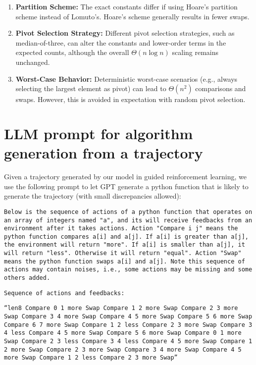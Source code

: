 \documentclass[pdflatex,sn-mathphys-num]{sn-jnl}%
\theoremstyle{thmstyleone}%
\theoremstyle{thmstyletwo}%
\theoremstyle{thmstylethree}%
\begin{document}
\begin{appendices}
\begin{enumerate}
    \item \textbf{Partition Scheme:} The exact constants differ if using Hoare's partition scheme instead of Lomuto's. Hoare's scheme generally results in fewer swaps.
    
    \item \textbf{Pivot Selection Strategy:} Different pivot selection strategies, such as median-of-three, can alter the constants and lower-order terms in the expected counts, although the overall \( \Theta(n \log n) \) scaling remains unchanged.
    
    \item \textbf{Worst-Case Behavior:} Deterministic worst-case scenarios (e.g., always selecting the largest element as pivot) can lead to \( \Theta(n^2) \) comparisons and swaps. However, this is avoided in expectation with random pivot selection.
\end{enumerate}

\section{LLM prompt for algorithm generation from a trajectory} \label{appendixB}

Given a trajectory generated by our model in guided reinforcement learning, we use the following prompt to let GPT generate a python function that is likely to generate the trajectory (with small discrepancies allowed):

\texttt{Below is the sequence of actions of a python function that operates on an array of integers named "a", and its will receive feedbacks from an environment after it takes actions. Action "Compare i j" means the python function compares a[i] and a[j]. If a[i] is greater than a[j], the environment will return "more". If a[i] is smaller than a[j], it will return "less". Otherwise it will return "equal". Action "Swap" means the python function swaps a[i] and a[j]. Note this sequence of actions may contain noises, i.e., some actions may be missing and some others added. }

\texttt{Sequence of actions and feedbacks:}

\texttt{``len8 Compare 0 1 more Swap Compare 1 2 more Swap Compare 2 3 more Swap Compare 3 4 more Swap Compare 4 5 more Swap Compare 5 6 more Swap Compare 6 7 more Swap Compare 1 2 less Compare 2 3 more Swap Compare 3 4 less Compare 4 5 more Swap Compare 5 6 more Swap Compare 0 1 more Swap Compare 2 3 less Compare 3 4 less Compare 4 5 more Swap Compare 1 2 more Swap Compare 2 3 more Swap Compare 3 4 more Swap Compare 4 5 more Swap Compare 1 2 less Compare 2 3 more Swap''}


\end{appendices}
\end{document}
